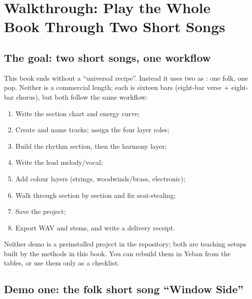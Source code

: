 \chapter{Walkthrough: Play the Whole Book Through Two Short Songs}
\label{ch:walkthrough}


\section{The goal: two short songs, one workflow}
\label{sec:walkthrough-goal}

This book ends without a ``universal recipe''. Instead it uses two  as : one folk, one pop. Neither is a commercial length; each is sixteen bars (eight-bar verse + eight-bar chorus), but both follow the same workflow:

\begin{enumerate}
\item Write the section chart and energy curve;
\item Create and name tracks; assign the four layer roles;
\item Build the rhythm section, then the harmony layer;
\item Write the lead melody/vocal;
\item Add colour layers (strings, woodwinds/brass, electronic);
\item Walk through section by section and fix seat-stealing;
\item Save the project;
\item Export WAV and stems, and write a delivery receipt.
\end{enumerate}

Neither demo is a preinstalled project in the repository; both are teaching setups built by the methods in this book. You can rebuild them in Yeban from the tables, or use them only as a checklist.

\section{Demo one: the folk short song ``Window Side''}
\label{sec:folk-demo}

